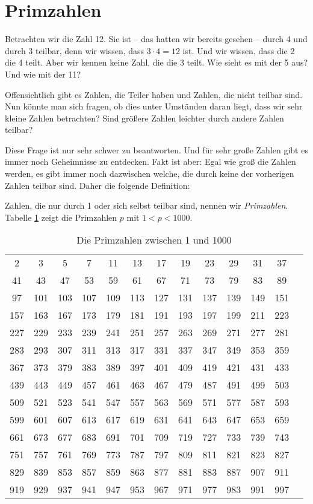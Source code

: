 \section{Primzahlen}

Betrachten wir die Zahl 12. Sie ist -- das hatten wir bereits gesehen -- durch 4 und durch 3 teilbar, denn wir wissen, dass $3\cdot 4 = 12$ ist. Und wir wissen, dass die 2 die 4 teilt. Aber wir kennen keine Zahl, die die 3 teilt. Wie sieht es mit der 5 aus? Und wie mit der 11?

Offensichtlich gibt es Zahlen, die Teiler haben und Zahlen, die nicht teilbar sind. Nun könnte man sich fragen, ob dies unter Umständen daran liegt, dass wir sehr kleine Zahlen betrachten? Sind größere Zahlen leichter durch andere Zahlen teilbar? 

Diese Frage ist nur sehr schwer zu beantworten. Und für sehr große Zahlen gibt es immer noch Geheimnisse zu entdecken. Fakt ist aber: Egal wie groß die Zahlen werden, es gibt immer noch dazwischen welche, die durch keine der vorherigen Zahlen teilbar sind. Daher die folgende Definition:

\begin{definition}
Zahlen, die nur durch 1 oder sich selbst teilbar sind, nennen wir \textsl{Primzahlen}. Tabelle \ref{tab:primes} zeigt die Primzahlen $p$ mit $1 < p < 1000$.
\end{definition}


\begin{table}
\begin{tabular}{ccccccccccccc}
2 & 3 & 5 & 7 & 11 & 13 & 17 & 19 & 23 & 29 & 31 & 37 &  \\
41 & 43 & 47 & 53 & 59 & 61 & 67 & 71 & 73 & 79 & 83 & 89 &  \\
97 & 101 & 103 & 107 & 109 & 113 & 127 & 131 & 137 & 139 & 149 & 151 &  \\
157 & 163 & 167 & 173 & 179 & 181 & 191 & 193 & 197 & 199 & 211 & 223 &  \\
227 & 229 & 233 & 239 & 241 & 251 & 257 & 263 & 269 & 271 & 277 & 281 &  \\
283 & 293 & 307 & 311 & 313 & 317 & 331 & 337 & 347 & 349 & 353 & 359 &  \\
367 & 373 & 379 & 383 & 389 & 397 & 401 & 409 & 419 & 421 & 431 & 433 &  \\
439 & 443 & 449 & 457 & 461 & 463 & 467 & 479 & 487 & 491 & 499 & 503 &  \\
509 & 521 & 523 & 541 & 547 & 557 & 563 & 569 & 571 & 577 & 587 & 593 &  \\
599 & 601 & 607 & 613 & 617 & 619 & 631 & 641 & 643 & 647 & 653 & 659 &  \\
661 & 673 & 677 & 683 & 691 & 701 & 709 & 719 & 727 & 733 & 739 & 743 &  \\
751 & 757 & 761 & 769 & 773 & 787 & 797 & 809 & 811 & 821 & 823 & 827 &  \\
829 & 839 & 853 & 857 & 859 & 863 & 877 & 881 & 883 & 887 & 907 & 911 &  \\
919 & 929 & 937 & 941 & 947 & 953 & 967 & 971 & 977 & 983 & 991 & 997 
\end{tabular}
\caption{Die Primzahlen zwischen 1 und 1000}\label{tab:primes}
\end{table}

